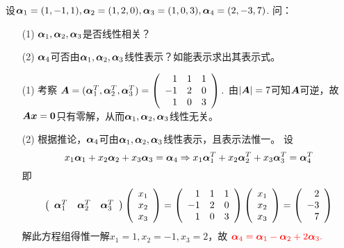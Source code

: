 \begin{frame}
\begin{li}
  设$\boldsymbol{\alpha}_1=(1,-1,1),\boldsymbol{\alpha}_2=(1,2,0),\boldsymbol{\alpha}_3=(1,0,3),\boldsymbol{\alpha}_4=(2,-3,7)$.  问：
  \begin{itemize}
  \item[(1)]$\boldsymbol{\alpha}_1,\boldsymbol{\alpha}_2,\boldsymbol{\alpha}_3$是否线性相关？
  \item[(2)]$\boldsymbol{\alpha}_4$可否由$\boldsymbol{\alpha}_1,\boldsymbol{\alpha}_2,\boldsymbol{\alpha}_3$线性表示？如能表示求出其表示式。
  \end{itemize}
\end{li} \pause 
\begin{jie}
\begin{itemize}
\item[(1)]    考察
  $
  \boldsymbol{A} = (\boldsymbol{\alpha}_1^T, \boldsymbol{\alpha}_2^T, \boldsymbol{\alpha}_3^T) = \left(
  \begin{array}{rrr}
    1&1&1\\
    -1&2&0\\
    1&0&3
  \end{array}
  \right). 
  $ \quad
  由$|\boldsymbol{A}|=7$可知$\boldsymbol{A}$可逆，故$\boldsymbol{A}{\boldsymbol{x}}=\boldsymbol{0}$只有零解，从而$\boldsymbol{\alpha}_1,\boldsymbol{\alpha}_2,\boldsymbol{\alpha}_3$线性无关。  \pause 
\item[(2)] 根据推论，$\boldsymbol{\alpha}_4$可由$\boldsymbol{\alpha}_1,\boldsymbol{\alpha}_2,\boldsymbol{\alpha}_3$线性表示，且表示法惟一。  设
  $$
  x_1\boldsymbol{\alpha}_1+x_2\boldsymbol{\alpha}_2+x_3\boldsymbol{\alpha}_3=\boldsymbol{\alpha}_4   \Rightarrow
  x_1\boldsymbol{\alpha}_1^T+x_2\boldsymbol{\alpha}_2^T+x_3\boldsymbol{\alpha}_3^T=\boldsymbol{\alpha}_4^T       
  $$
  即$$
  \left(
  \begin{array}{ccc}
    \boldsymbol{\alpha}_1^T &\boldsymbol{\alpha}_2^T& \boldsymbol{\alpha}_3^T  
  \end{array}
  \right) \left(
  \begin{array}{c}
    x_1\\
    x_2\\
    x_3
  \end{array}
  \right)= 
  \left(
  \begin{array}{rrr}
    1&1&1\\
    -1&2&0\\
    1&0&3
  \end{array}
  \right) \left(
  \begin{array}{c}
    x_1\\
    x_2\\
    x_3
  \end{array}
  \right) =  \left(
  \begin{array}{r}
    2\\
    -3\\
    7
  \end{array}
  \right)
  $$  
  解此方程组得惟一解$x_1=1,x_2=-1,x_3=2$，故
  $
  \textcolor{red}{\boldsymbol{\alpha}_4=\boldsymbol{\alpha}_1-\boldsymbol{\alpha}_2+2\boldsymbol{\alpha}_3.}
  $
\end{itemize}
\end{jie}
\end{frame}

